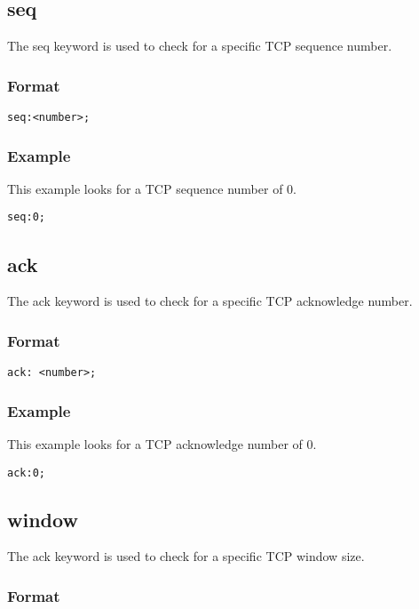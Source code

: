 \documentclass[english]{report}
\begin{document}
\subsection{seq}

The seq keyword is used to check for a specific TCP sequence number.

\subsubsection{Format}
\begin{verbatim}
seq:<number>;
\end{verbatim}

\subsubsection{Example}
This example looks for a TCP sequence number of 0.

\begin{verbatim}
seq:0;
\end{verbatim}


\subsection{ack}

The ack keyword is used to check for a specific TCP acknowledge number.

\subsubsection{Format}
\begin{verbatim}
ack: <number>;
\end{verbatim}

\subsubsection{Example}
This example looks for a TCP acknowledge number of 0.
\begin{verbatim}
ack:0;
\end{verbatim}

\subsection{window}

The ack keyword is used to check for a specific TCP window size.

\subsubsection{Format}
\end{document}

